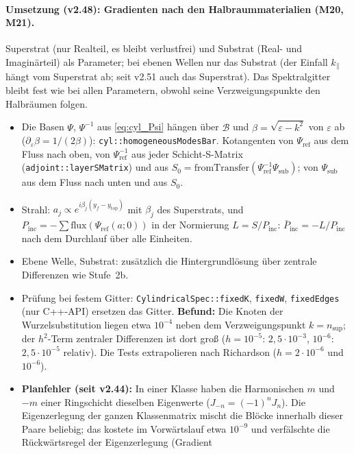 \paragraph{Umsetzung (v2.48): Gradienten nach den Halbraummaterialien (M20, M21).}
Superstrat (nur Realteil, es bleibt verlustfrei) und Substrat (Real- und Imaginärteil) als Parameter; bei ebenen Wellen
nur das Substrat (der Einfall $k_\parallel$ hängt vom Superstrat ab; seit v2.51 auch das Superstrat). Das Spektralgitter bleibt fest wie bei allen
Parametern, obwohl seine Verzweigungspunkte den Halbräumen folgen.
\begin{itemize}[nosep]
  \item Die Basen $\Psi$, $\Psi^{-1}$ aus \eqref{eq:cyl_Psi} hängen über $\mathcal B$ und $\beta=\sqrt{\varepsilon-k^2}$ von $\varepsilon$ ab
        ($\partial_\varepsilon\beta=1/(2\beta)$): \verb|cyl::homogeneousModesBar|. Kotangenten von $\Psi_{\text{ref}}$ aus dem
        Fluss nach oben, von $\Psi_{\text{ref}}^{-1}$ aus jeder Schicht-S-Matrix (\verb|adjoint::layerSMatrix|) und aus
        $S_0=\text{fromTransfer}(\Psi_{\text{ref}}^{-1}\Psi_{\text{sub}})$; von $\Psi_{\text{sub}}$ aus dem Fluss nach unten und aus $S_0$.
  \item Strahl: $a_j\propto e^{i\beta_j(y_f-y_{\text{top}})}$ mit $\beta_j$ des Superstrats, und $P_{\text{inc}}=-\sum\text{flux}(\Psi_{\text{ref}}(a;0))$
        in der Normierung $L=S/P_{\text{inc}}$: $\bar P_{\text{inc}}=-L/P_{\text{inc}}$ nach dem Durchlauf über alle Einheiten.
  \item Ebene Welle, Substrat: zusätzlich die Hintergrundlösung über zentrale Differenzen wie Stufe~2b.
  \item Prüfung bei festem Gitter: \verb|CylindricalSpec::fixedK|, \verb|fixedW|, \verb|fixedEdges| (nur C++-API) ersetzen das
        Gitter. \textbf{Befund:} Die Knoten der Wurzelsubstitution liegen etwa $10^{-4}$ neben dem Verzweigungspunkt
        $k=n_{\text{sup}}$; der $h^2$-Term zentraler Differenzen ist dort groß ($h=10^{-5}$: $2{,}5\cdot10^{-3}$, $10^{-6}$: $2{,}5\cdot10^{-5}$
        relativ). Die Tests extrapolieren nach Richardson ($h=2\cdot10^{-6}$ und $10^{-6}$).
  \item \textbf{Planfehler (seit v2.44):} In einer Klasse haben die Harmonischen $m$ und $-m$ einer Ringschicht dieselben
        Eigenwerte ($J_{-n}=(-1)^nJ_n$). Die Eigenzerlegung der ganzen Klassenmatrix mischt die Blöcke innerhalb dieser Paare
        beliebig; das kostete im Vorwärtslauf etwa $10^{-9}$ und verfälschte die Rückwärtsregel der Eigenzerlegung (Gradient

\end{itemize}

